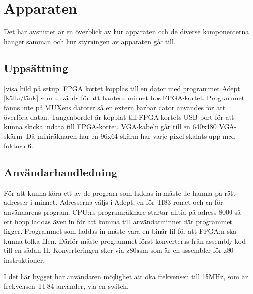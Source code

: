 \documentclass[main.tex]{subfiles}
\begin{document}
\section{Apparaten}
Det här avsnittet är en överblick av hur apparaten och de diverse komponenterna
hänger samman och hur styrningen av apparaten går till.
\subsection{Uppsättning}
[visa bild på setup] FPGA kortet kopplas till en dator med programmet Adept
[källa/länk] som används för att hantera minnet hos FPGA-kortet. Programmet
fanns inte på MUXens datorer så en extern bärbar dator användes för att
överföra datan. Tangenbordet är kopplat till FPGA-kortets USB port för att
kunna skicka indata till FPGA-kortet. VGA-kabeln går till en 640x480 VGA-skärm.
Då miniräknaren har en 96x64 skärm har varje pixel skalats upp med faktorn 6.

\subsection{Användarhandledning}
För att kunna köra ett av de program som laddas in måste de hamna på rätt
adresser i minnet. Adresserna väljs i Adept, en för TI83-romet och en för
användarens program. CPU:ns programräknare startar alltid på adress 8000 så ett
hopp laddas även in för att komma till användarminnet där programmet ligger.
Programmet som laddas in måste vara en binär fil för att FPGA:n ska kunna tolka
filen. Därför måste programmet först konverteras från assembly-kod till en
sådan fil. Konverteringen sker via z80asm som är en assembler för z80
instruktioner.

I det här bygget har användaren möjlighet att öka frekvensen till 15MHz, som är
frekvensen TI-84 använder, via en switch.



\clearpage
\end{document}
